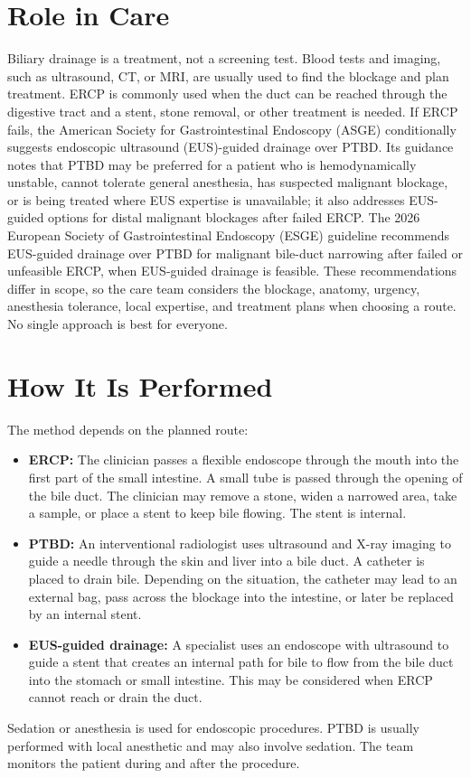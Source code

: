 \section*{Role in Care}
Biliary drainage is a treatment, not a screening test. Blood tests and imaging, such as ultrasound, CT, or MRI, are usually used to find the blockage and plan treatment. ERCP is commonly used when the duct can be reached through the digestive tract and a stent, stone removal, or other treatment is needed. If ERCP fails, the American Society for Gastrointestinal Endoscopy (ASGE) conditionally suggests endoscopic ultrasound (EUS)-guided drainage over PTBD. Its guidance notes that PTBD may be preferred for a patient who is hemodynamically unstable, cannot tolerate general anesthesia, has suspected malignant blockage, or is being treated where EUS expertise is unavailable; it also addresses EUS-guided options for distal malignant blockages after failed ERCP. The 2026 European Society of Gastrointestinal Endoscopy (ESGE) guideline recommends EUS-guided drainage over PTBD for malignant bile-duct narrowing after failed or unfeasible ERCP, when EUS-guided drainage is feasible. These recommendations differ in scope, so the care team considers the blockage, anatomy, urgency, anesthesia tolerance, local expertise, and treatment plans when choosing a route. No single approach is best for everyone.

\section*{How It Is Performed}
The method depends on the planned route:
\begin{itemize}
  \item \textbf{ERCP:} The clinician passes a flexible endoscope through the mouth into the first part of the small intestine. A small tube is passed through the opening of the bile duct. The clinician may remove a stone, widen a narrowed area, take a sample, or place a stent to keep bile flowing. The stent is internal.
  \item \textbf{PTBD:} An interventional radiologist uses ultrasound and X-ray imaging to guide a needle through the skin and liver into a bile duct. A catheter is placed to drain bile. Depending on the situation, the catheter may lead to an external bag, pass across the blockage into the intestine, or later be replaced by an internal stent.
  \item \textbf{EUS-guided drainage:} A specialist uses an endoscope with ultrasound to guide a stent that creates an internal path for bile to flow from the bile duct into the stomach or small intestine. This may be considered when ERCP cannot reach or drain the duct.
\end{itemize}
Sedation or anesthesia is used for endoscopic procedures. PTBD is usually performed with local anesthetic and may also involve sedation. The team monitors the patient during and after the procedure.

